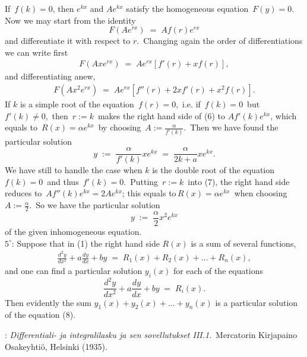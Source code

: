 \documentclass[12pt]{article}
\begin{document}
If\, $f(k) =0$, then $e^{kx}$ and $Ae^{kx}$ satisfy the 
homogeneous equation\, $F(y) = 0$.\, Now we may start from the 
identity
$$F(Ae^{rx}) \;=\; Af(r)e^{rx}$$
and differentiate it with respect to $r$.\, Changing again the 
order of differentiations we can write first
\begin{align}
F(Axe^{rx}) \;=\; Ae^{rx}[f'(r)\!+\!xf(r)],
\end{align}
and differentiating anew,
\begin{align}
F(Ax^2e^{rx}) \;=\; Ae^{rx}[f''(r)\!+\!2xf'(r)\!+\!x^2f(r)].
\end{align}
If $k$ is a simple root of the equation\, $f(r) = 0$,\, i.e. 
if\, $f(k) = 0$\, but\, $f'(k) \neq 0$,\, then\, $r := k$\, 
makes the right hand side of (6) to $Af'(k)e^{kx}$, which 
equals to\, $R(x) = \alpha e^{kx}$\, by choosing\, 
$A := \frac{\alpha}{f'(k)}$.\, Then we have found the 
particular solution
$$y \;:=\; \frac{\alpha}{f'(k)}xe^{kx} 
     \;=\; \frac{\alpha}{2k\!+\!a}xe^{kx}.$$
We have still to handle the case when $k$ is the double root of 
the equation\, $f(k) = 0$\, and thus\, $f'(k) = 0$.\, Putting\,  
$r := k$\, into (7), the right hand side reduces to\, 
$Af''(k)e^{kx} = 2Ae^{kx}$; this equals to\,$R(x) = \alpha e^{kx}$\, 
when choosing $A := \frac{\alpha}{2}$.\, So we have the 
particular solution
$$y \;:=\; \frac{\alpha}{2}x^2e^{kx}$$
of the given inhomogeneous equation.\\


\textbf{$5^\circ$}\!:\; Suppose that in (1) the right hand side 
$R(x)$ is a sum of several functions,
\begin{align}
\frac{d^2y}{dx^2}+a\frac{dy}{dx}+by \;=\; 
R_1(x)+R_2(x)+\ldots+R_n(x),
\end{align}
and one can find a particular solution $y_i(x)$ for each of 
the equations
$$\frac{d^2y}{dx^2}+a\frac{dy}{dx}+by \;=\; R_i(x).$$
Then evidently the sum $y_1(x)+y_2(x)+\ldots+y_n(x)$ is a 
particular solution of the equation (8).\\

\begin{thebibliography}{8}
: {\em Differentiali- ja integralilasku
ja sen sovellutukset III.1}.\, Mercatorin Kirjapaino Osakeyhti\"o, Helsinki (1935).
\end{thebibliography}\\
\end{document}
